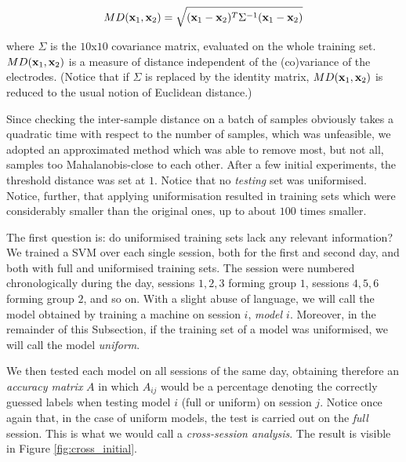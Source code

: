 $$ MD(\mathbf{x}_1,\mathbf{x}_2) = \sqrt{(\mathbf{x}_1-\mathbf{x}_2)^T \Sigma^{-1} (\mathbf{x}_1-\mathbf{x}_2)} $$

\noindent where $\Sigma$ is the $10$x$10$ covariance matrix, evaluated
on the whole training set. $MD(\mathbf{x}_1,\mathbf{x}_2)$ is a measure of distance
independent of the (co)variance of the electrodes. (Notice that if
$\Sigma$ is replaced by the identity matrix, $MD(\mathbf{x}_1,\mathbf{x}_2)$ is
reduced to the usual notion of Euclidean distance.)

Since checking the inter-sample distance on a batch of samples
obviously takes a quadratic time with respect to the number of
samples, which was unfeasible, we adopted an approximated method which
was able to remove most, but not all, samples too Mahalanobis-close to
each other. After a few initial experiments, the threshold distance
was set at $1$. Notice that no \emph{testing} set was uniformised.
Notice, further, that applying uniformisation resulted in training
sets which were considerably smaller than the original ones, up to
about $100$ times smaller.

The first question is: do uniformised training sets lack any relevant
information? We trained a SVM over each single session, both for the
first and second day, and both with full and uniformised training
sets. The session were numbered chronologically during the day,
sessions $1,2,3$ forming group $1$, sessions $4,5,6$ forming group
$2$, and so on. With a slight abuse of language, we will call the
model obtained by training a machine on session $i$, \emph{model
$i$}. Moreover, in the remainder of this Subsection, if the training
set of a model was uniformised, we will call the model \emph{uniform}.

We then tested each model on all sessions of the same day, obtaining
therefore an \emph{accuracy matrix} $A$ in which $A_{ij}$ would be a
percentage denoting the correctly guessed labels when testing model
$i$ (full or uniform) on session $j$. Notice once again that, in the
case of uniform models, the test is carried out on the \emph{full}
session. This is what we would call a \emph{cross-session analysis}.
The result is visible in Figure \ref{fig:cross_initial}.

